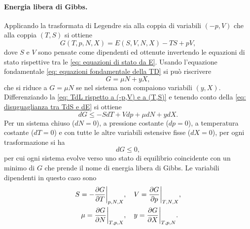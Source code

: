 \paragraph{Energia libera di Gibbs.} Applicando la trasformata di Legendre sia alla coppia di variabili $(-p,V)$ che alla coppia $(T,S)$ si ottiene
\begin{equation}
\label{eq: TdL rispetto a (-p,V) e a (T,S)}
    G(T,p,N,X) = E(S,V,N,X) - TS +pV,
\end{equation}
dove $S$ e $V$ sono pensate come dipendenti ed ottenute invertendo le equazioni di stato rispettive tra le \eqref{eq: equazioni di stato da E}. Usando l'equazione fondamentale \eqref{eq: equazioni fondamentale della TD} si può riscrivere
\begin{equation}
\label{eq: espressione di G}
    G = \mu N + yX,
\end{equation}
che si riduce a $G = \mu N$ se nel sistema non compaiono variabili $(y,X)$. Differenziando la \eqref{eq: TdL rispetto a (-p,V) e a (T,S)} e tenendo conto della \eqref{eq: disuguaglianza tra TdS e dE} si ottiene
\begin{equation}
    dG \le -SdT + Vdp +\mu dN +ydX.
\end{equation}
Per un sistema chiuso ($dN = 0$), a pressione costante ($dp = 0$), a temperatura costante ($dT = 0$) e con tutte le altre variabili estensive fisse ($dX = 0$), per ogni trasformazione si ha
\begin{equation}
    dG \le 0,
\end{equation}
per cui ogni sistema evolve verso uno stato di equilibrio coincidente con un minimo di $G$ che prende il nome di energia libera di Gibbs. Le variabili dipendenti in questo caso sono
\begin{equation}
\label{eq: equazioni di stato da G}
    \begin{split}
        S = -\frac{\partial G}{\partial T}\bigg|_{p,N,X}&,\quad V = \frac{\partial G}{\partial p}\bigg|_{T,N,X}, \\
        \mu = \frac{\partial G}{\partial N}\bigg|_{T,p,X}&,\quad y = \frac{\partial G}{\partial X}\bigg|_{T,p,N}.
    \end{split}
\end{equation}

